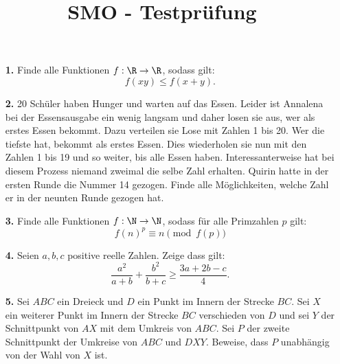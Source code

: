 \documentclass[language=german,style=exam]{smo}
\title{SMO - Testprüfung}
\begin{document}
\begin{enumerate}

\item[\textbf{1.}] Finde alle Funktionen $f: \R \rightarrow \R$, sodass gilt:
\[
f(xy) \leq f(x+y).
\]

\bigskip

\item[\textbf{2.}] 20 Schüler haben Hunger und warten auf das Essen. Leider ist Annalena bei der Essensausgabe ein wenig langsam und daher losen sie aus, wer als erstes Essen bekommt. Dazu verteilen sie Lose mit Zahlen 1 bis 20. Wer die tiefste hat, bekommt als erstes Essen. Dies wiederholen sie nun mit den Zahlen 1 bis 19 und so weiter, bis alle Essen haben. Interessanterweise hat bei diesem Prozess niemand zweimal die selbe Zahl erhalten. Quirin hatte in der ersten Runde die Nummer 14 gezogen. Finde alle Möglichkeiten, welche Zahl er in der neunten Runde gezogen hat.

\bigskip

\item[\textbf{3.}] Finde alle Funktionen $f: \N \rightarrow \N$, sodass für alle Primzahlen $p$ gilt: 
\[
f(n)^p \equiv n \pmod{f(p)}
\]

\bigskip

\item[\textbf{4.}] Seien $a,b,c$ positive reelle Zahlen. Zeige dass gilt: 
\[
\frac{a^2}{a+b} + \frac{b^2}{b+c} \geq \frac{3a+2b-c}{4}.
\]

\bigskip

\item[\textbf{5.}] Sei $ABC$ ein Dreieck und $D$ ein Punkt im Innern der Strecke $BC$. Sei $X$ ein weiterer Punkt im Innern der Strecke $BC$ verschieden von $D$ und sei $Y$ der Schnittpunkt von $AX$ mit  dem Umkreis von $ABC$. Sei $P$ der zweite Schnittpunkt der Umkreise von $ABC$ und $DXY$. Beweise, dass $P$ unabhängig von der Wahl von $X$ ist.\\

\bigskip

\end{enumerate}

\vspace{1cm}

\end{document}
